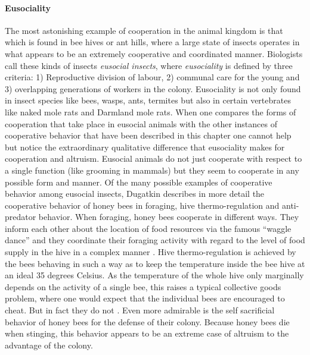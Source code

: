 \paragraph{Eusociality}
\label{eusociality}
The most astonishing example of cooperation in the animal kingdom is that
which is found in bee hives or ant hills, where a large state of insects
operates in what appears to be an extremely cooperative and coordinated
manner. Biologists call these kinds of insects {\em eusocial insects}, where
{\em eusociality} is defined by three criteria: 1) Reproductive division of
labour, 2) communal care for the young and 3) overlapping generations of
workers in the colony. Eusociality is not only found in insect species like
bees, wasps, ants, termites but also in certain vertebrates like naked mole
rats and Darmland mole rats. When one compares the forms of cooperation that
take place in eusocial animals with the other instances of cooperative
behavior that have been described in this chapter one cannot help but notice
the extraordinary qualitative difference that eusociality makes for
cooperation and altruism. Eusocial animals do not just cooperate with respect
to a single function (like grooming in mammals) but they seem to cooperate in
any possible form and manner. Of the many possible examples of cooperative
behavior among eusocial insects, Dugatkin describes in more detail the
cooperative behavior of honey bees in foraging, hive thermo-regulation and
anti-predator behavior.  When foraging, honey bees cooperate in different
ways. They inform each other about the location of food resources via the
famous ``waggle dance'' and they coordinate their foraging activity with
regard to the level of food supply in the hive in a complex manner \cite[p.\ 
152/153]{dugatkin:1997}. Hive thermo-regulation is achieved by the bees
behaving in such a way as to keep the temperature inside the bee hive at an
ideal 35 degrees Celsius. As the temperature of the whole hive only marginally
depends on the activity of a single bee, this raises a typical collective
goods problem, where one would expect that the individual bees are encouraged
to cheat. But in fact they do not \cite[p.\ 154/155]{dugatkin:1997}. Even more
admirable is the self sacrificial behavior of honey bees for the defense of
their colony. Because honey bees die when stinging, this behavior appears to
be an extreme case of altruism to the advantage of the colony.

